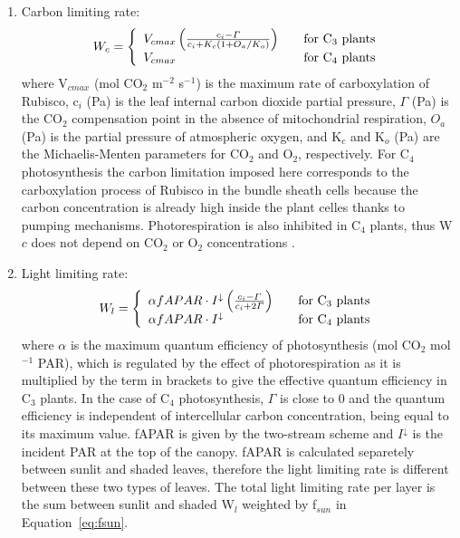 \documentclass[twoside,10pt]{report}
\begin{document}
\begin{enumerate}
 \item Carbon limiting rate:
\begin{equation}\label{eq:wc}
 W_c = \left\{
  \begin{array}{l l}
    V_{cmax}\left(\frac{c_i-\varGamma}{c_i+K_c(1+O_a/K_o)}\right) & 
   \quad \textrm{for C$_3$ plants}\\
    V_{cmax} & 
     \quad \textrm {for C$_4$ plants}
  \end{array}\right.
 \end{equation}
\noindent where V$_{cmax}$ (mol CO$_2$ m$^{-2}$ s$^{-1}$) is the maximum rate of carboxylation of Rubisco, c$_i$ (Pa) is the leaf internal carbon dioxide partial pressure, $\varGamma$ (Pa) is the CO$_2$ compensation point in the absence of mitochondrial respiration, $O_a$ (Pa) is the partial pressure of atmospheric oxygen, and K$_c$ and K$_o$ (Pa) are the Michaelis-Menten parameters for CO$_2$ and O$_2$, respectively. For C$_4$ photosynthesis the carbon limitation imposed here corresponds to the carboxylation process of Rubisco in the bundle sheath cells because the carbon concentration is already high inside the plant celles thanks to pumping mechanisms. Photorespiration is also inhibited in C$_4$ plants, thus W$c$ does not depend on CO$_2$ or O$_2$ concentrations \citep{Collatz1992}.

 \item Light limiting rate:
\begin{equation}\label{eq:wl}
 W_l = \left\{
  \begin{array}{l l}
    \alpha fAPAR \cdot I^{\downarrow} \left(\frac{c_i-\varGamma}{c_i+2\varGamma}\right)  & 
   \quad \textrm{for C$_3$ plants}\\
    \alpha fAPAR \cdot I^{\downarrow} & 
     \quad \textrm {for C$_4$ plants}
  \end{array}\right.
 \end{equation}
\noindent where $\alpha$ is the maximum quantum efficiency of photosynthesis (mol CO$_2$ mol$^{−1}$ PAR), which is regulated by the effect of photorespiration as it is multiplied by the term in brackets to give the effective quantum efficiency in C$_3$ plants. In the case of C$_4$ photosynthesis, $\varGamma$ is close to 0 and the quantum efficiency is independent of intercellular carbon concentration, being equal to its maximum value. fAPAR is given by the two-stream scheme and $I^{\downarrow}$ is the incident PAR at the top of the canopy. fAPAR is calculated separetely between sunlit and shaded leaves, therefore the light limiting rate is different between these two types of leaves. The total light limiting rate per layer is the sum between sunlit and shaded W$_l$ weighted by f$_{sun}$ in Equation~\ref{eq:fsun}.


\end{enumerate}
\end{document}
